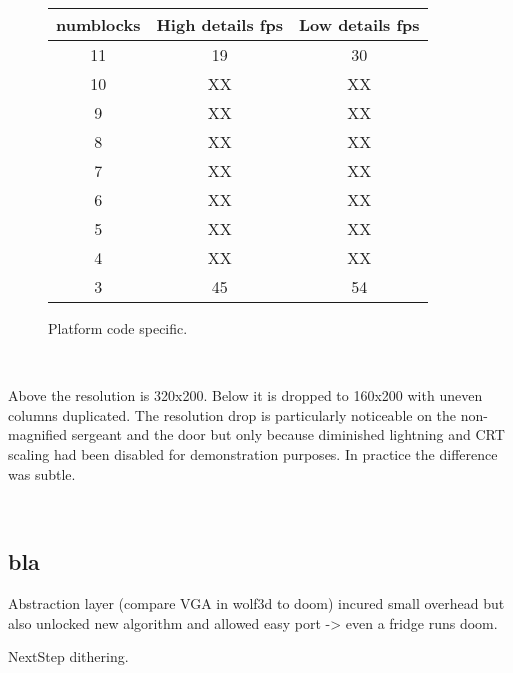 \begin{figure}[H]
\centering  
\begin{tabularx}{0.7\textwidth}{ C{1}  C{1} C{1}}
  \toprule
  \textbf{numblocks} & \textbf{High details fps} &  \textbf{Low details fps}\\
  \toprule 

            
11 &  19     &        30 \\
10  &  XX      &      XX \\
9  &  XX      &       XX \\
8  &  XX      &       XX \\
7  &  XX      &       XX \\
6  &  XX      &       XX \\
5  &  XX      &       XX \\
4  &  XX      &       XX \\
3  &  45      &       54 \\
  \toprule
\end{tabularx}
\caption{Platform code specific.}
\end{figure}

\\
\par
Above the resolution is 320x200. Below it is dropped to 160x200 with uneven columns duplicated. The resolution drop is particularly noticeable on the non-magnified sergeant and the door but only because diminished lightning and CRT scaling had been disabled for demonstration purposes. In practice the difference was subtle.\\
\par
{}\\


\subsection{bla}
\par

Abstraction layer (compare VGA in wolf3d to doom) incured small overhead but also unlocked new algorithm and allowed easy port -> even a fridge runs doom.\\
\par
NextStep dithering.\\
\\ 


